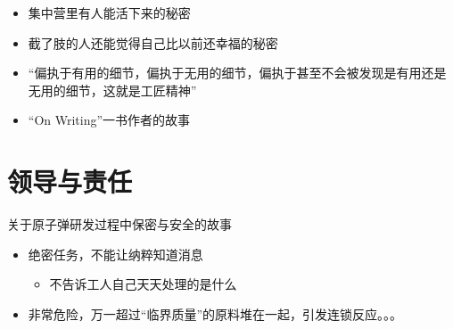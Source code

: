 \documentclass[presentation,dvipdfmx,CJKbookmarks]{beamer}
\begin{document}
\begin{CJK*}{UTF8}{simsun}
\begin{itemize}
\item 集中营里有人能活下来的秘密
\item 截了肢的人还能觉得自己比以前还幸福的秘密
\item “偏执于有用的细节，偏执于无用的细节，偏执于甚至不会被发现是有用还是无用的细节，这就是工匠精神”
\item “On Writing”一书作者的故事
\end{itemize}

\section{领导与责任}
\label{sec:orgdbec944}

\begin{frame}[label={sec:orge60f6c3}]{关于原子弹研发过程中保密与安全的故事}
\begin{itemize}
\item 绝密任务，不能让纳粹知道消息
\begin{itemize}
\item 不告诉工人自己天天处理的是什么
\end{itemize}
\item 非常危险，万一超过“临界质量”的原料堆在一起，引发连锁反应。。。
\end{itemize}
\end{frame}
\end{CJK*}
\end{document}
